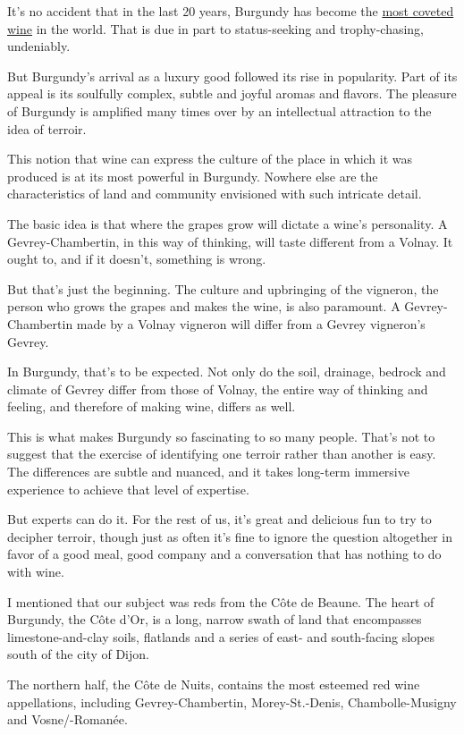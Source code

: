 It's no accident that in the last 20 years, Burgundy has become the
\href{https://www.nytimes3xbfgragh.onion/2019/09/12/dining/drinks/value-burgundy-wine.html}{most
coveted wine} in the world. That is due in part to status-seeking and
trophy-chasing, undeniably.

But Burgundy's arrival as a luxury good followed its rise in popularity.
Part of its appeal is its soulfully complex, subtle and joyful aromas
and flavors. The pleasure of Burgundy is amplified many times over by an
intellectual attraction to the idea of terroir.

This notion that wine can express the culture of the place in which it
was produced is at its most powerful in Burgundy. Nowhere else are the
characteristics of land and community envisioned with such intricate
detail.

The basic idea is that where the grapes grow will dictate a wine's
personality. A Gevrey-Chambertin, in this way of thinking, will taste
different from a Volnay. It ought to, and if it doesn't, something is
wrong.

But that's just the beginning. The culture and upbringing of the
vigneron, the person who grows the grapes and makes the wine, is also
paramount. A Gevrey-Chambertin made by a Volnay vigneron will differ
from a Gevrey vigneron's Gevrey.

In Burgundy, that's to be expected. Not only do the soil, drainage,
bedrock and climate of Gevrey differ from those of Volnay, the entire
way of thinking and feeling, and therefore of making wine, differs as
well.

This is what makes Burgundy so fascinating to so many people. That's not
to suggest that the exercise of identifying one terroir rather than
another is easy. The differences are subtle and nuanced, and it takes
long-term immersive experience to achieve that level of expertise.

But experts can do it. For the rest of us, it's great and delicious fun
to try to decipher terroir, though just as often it's fine to ignore the
question altogether in favor of a good meal, good company and a
conversation that has nothing to do with wine.

I mentioned that our subject was reds from the Côte de Beaune. The heart
of Burgundy, the Côte d'Or, is a long, narrow swath of land that
encompasses limestone-and-clay soils, flatlands and a series of east-
and south-facing slopes south of the city of Dijon.

The northern half, the Côte de Nuits, contains the most esteemed red
wine appellations, including Gevrey-Chambertin, Morey-St.-Denis,
Chambolle-Musigny and Vosne/-Romanée.

